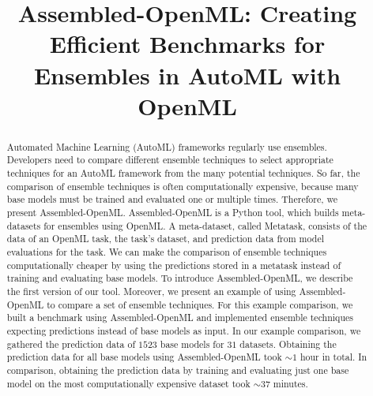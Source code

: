 \documentclass[11pt]{article}
\title{Assembled-OpenML: Creating Efficient Benchmarks for Ensembles in AutoML with OpenML}
\author[1]{\nameemail{Lennart Purucker}{lennart.purucker@uni-siegen.de}}
\author[1]{\nameemail{Joeran Beel}{joeran.beel@uni-siegen.de}}
\affil[1]{University of Siegen}
\begin{document}
\maketitle

\begin{abstract}
Automated Machine Learning (AutoML) frameworks regularly use ensembles.
Developers need to compare different ensemble techniques to select appropriate techniques for an AutoML framework from the many potential techniques. 
So far, the comparison of ensemble techniques is often computationally expensive, because many base models must be trained and evaluated one or multiple times.
Therefore, we present Assembled-OpenML. Assembled-OpenML is a Python tool, which builds meta-datasets for ensembles using OpenML.
A meta-dataset, called Metatask, consists of the data of an OpenML task, the task's dataset, and prediction data from model evaluations for the task. 
We can make the comparison of ensemble techniques computationally cheaper by using the predictions stored in a metatask instead of training and evaluating base models.
To introduce Assembled-OpenML, we describe the first version of our tool. Moreover, we present an example of using Assembled-OpenML to compare a set of ensemble techniques. 
For this example comparison, we built a benchmark using Assembled-OpenML and implemented ensemble techniques expecting predictions instead of base models as input.
In our example comparison, we gathered the prediction data of $1523$ base models for $31$ datasets. Obtaining the prediction data for all base models using Assembled-OpenML took ${\sim} 1$ hour in total. In comparison, obtaining the prediction data by training and evaluating just one base model on the most computationally expensive dataset took ${\sim} 37$ minutes.  
\end{abstract}
\end{document}
